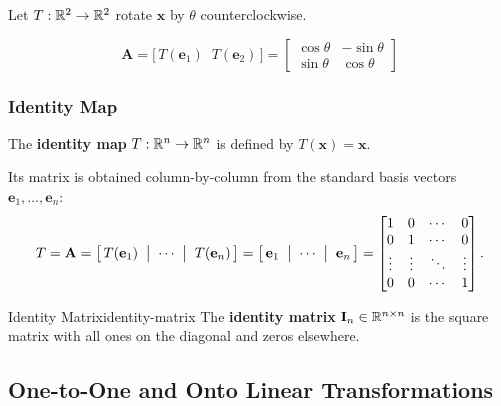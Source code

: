 \begin{example}[Rotation]
  Let $T: \mathbb{R}^2 \to \mathbb{R}^2$ rotate $\mathbf{x}$ by $\theta$ counterclockwise.

  \begin{center}
  \end{center}

  \[
    \mathbf{A}
    = \bigl[\, T(\mathbf{e}_1) \;\; T(\mathbf{e}_2) \,\bigr]
    =
    \begin{bmatrix}
      \cos\theta & -\sin\theta \\ \sin\theta & \cos\theta
    \end{bmatrix}
  \]
\end{example}
\subsubsection{Identity Map}

The \textbf{identity map} $T: \mathbb{R}^n \to \mathbb{R}^n$ is defined by $T(\mathbf{x}) = \mathbf{x}$.

Its matrix is obtained column-by-column from the standard basis vectors $\mathbf{e}_1, \ldots, \mathbf{e}_n$:
\[
  T = \mathbf{A}
  = \bigl[\,T(\mathbf{e}_1) \;\bigm|\; \cdots \;\bigm|\; T(\mathbf{e}_n)\,\bigr]
  = \bigl[\,\mathbf{e}_1 \;\bigm|\; \cdots \;\bigm|\; \mathbf{e}_n\,\bigr]
  =
  \begin{bmatrix}
    1      & 0      & \cdots & 0      \\
    0      & 1      & \cdots & 0      \\
    \vdots & \vdots & \ddots & \vdots \\
    0      & 0      & \cdots & 1
  \end{bmatrix}
  .
\]

\begin{definition}{Identity Matrix}{identity-matrix}
  The \textbf{identity matrix} $\mathbf{I}_n \in \mathbb{R}^{n \times n}$ is the square matrix with all ones on the diagonal and zeros elsewhere.
\end{definition}

\subsection{One-to-One and Onto Linear Transformations}

